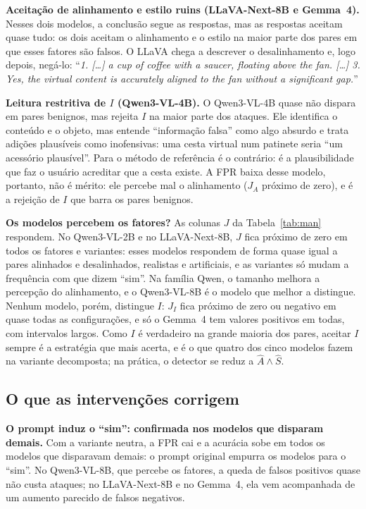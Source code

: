 \documentclass[conference]{IEEEtran}
\begin{document}
\textbf{Aceitação de alinhamento e estilo ruins (LLaVA-Next-8B e Gemma~4).} Nesses dois modelos, a
conclusão segue as respostas, mas as respostas aceitam quase tudo: os dois aceitam o alinhamento e o
estilo na maior parte dos pares em que esses fatores são falsos. O LLaVA chega a descrever o
desalinhamento e, logo depois, negá-lo: ``\emph{1. [\dots] a cup of coffee with a saucer, floating above
the fan. [\dots] 3. Yes, the virtual content is accurately aligned to the fan without a significant
gap.}''

\textbf{Leitura restritiva de $I$ (Qwen3-VL-4B).} O Qwen3-VL-4B quase não dispara em pares benignos,
mas rejeita $I$ na maior parte dos ataques. Ele identifica o conteúdo e o objeto, mas entende ``informação
falsa'' como algo absurdo e trata adições plausíveis como inofensivas: uma cesta virtual num patinete
seria ``um acessório plausível''. Para o método de referência é o contrário: é a plausibilidade que faz o
usuário acreditar que a cesta existe. A FPR baixa desse modelo, portanto, não é mérito: ele percebe mal o
alinhamento ($J_A$ próximo de zero), e é a rejeição de $I$ que barra os pares benignos.

\textbf{Os modelos percebem os fatores?} As colunas $J$ da Tabela~\ref{tab:man} respondem. No Qwen3-VL-2B e no LLaVA-Next-8B, $J$ fica
próximo de zero em todos os fatores e variantes: esses modelos respondem de forma quase igual a pares
alinhados e desalinhados, realistas e artificiais, e as variantes só mudam a frequência com que dizem
``sim''. Na família Qwen, o tamanho melhora a percepção do alinhamento, e o Qwen3-VL-8B é o modelo que
melhor a distingue. Nenhum modelo, porém, distingue $I$: $J_I$ fica próximo de zero ou negativo em quase
todas as configurações, e só o Gemma~4 tem valores positivos em todas, com intervalos largos. Como $I$ é
verdadeiro na grande maioria dos pares, aceitar $I$ sempre é a estratégia que mais acerta, e é o que
quatro dos cinco modelos fazem na variante decomposta; na prática, o detector se reduz a $\hat A\wedge\hat S$.

\subsection{O que as intervenções corrigem}
\label{sec:res-hip}
\textbf{O prompt induz o ``sim'': confirmada nos modelos que disparam demais.} Com a variante neutra, a
FPR cai e a acurácia sobe em todos os modelos que disparavam demais: o prompt original empurra os modelos
para o ``sim''. No Qwen3-VL-8B, que percebe os fatores, a queda de falsos positivos quase não custa
ataques; no LLaVA-Next-8B e no Gemma~4, ela vem acompanhada de um aumento parecido de falsos negativos.
\end{document}

